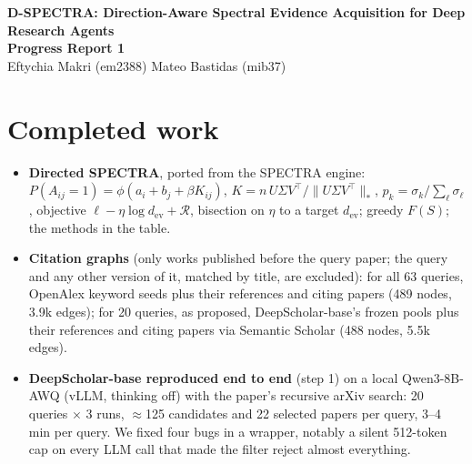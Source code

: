 \documentclass[10pt]{article}
\begin{document}
\begin{center}
{\large\bfseries D-SPECTRA: Direction-Aware Spectral Evidence Acquisition for Deep Research Agents\\[1pt]
Progress Report 1}\\[1pt]
Eftychia Makri (em2388) \quad Mateo Bastidas (mib37)
\end{center}
\vspace{-5pt}

\section{Completed work}
\begin{itemize}
\item \textbf{Directed SPECTRA}, ported from the SPECTRA engine: $P(A_{ij}{=}1)=\phi(a_i+b_j+\beta K_{ij})$, $K=n\,U\Sigma V^\top/\|U\Sigma V^\top\|_*$, $p_k=\sigma_k/\sum_\ell\sigma_\ell$, objective $\ell-\eta\log d_{\mathrm{ev}}+\mathcal{R}$, bisection on $\eta$ to a target $d_{\mathrm{ev}}$; greedy $F(S)$; the methods in the table.
\item \textbf{Citation graphs} (only works published before the query paper; the query and any other version of it, matched by title, are excluded): for all 63 queries, OpenAlex keyword seeds plus their references and citing papers (489 nodes, 3.9k edges); for 20 queries, as proposed, DeepScholar-base's frozen pools plus their references and citing papers via Semantic Scholar (488 nodes, 5.5k edges).
\item \textbf{DeepScholar-base reproduced end to end} (step 1) on a local Qwen3-8B-AWQ (vLLM, thinking off) with the paper's recursive arXiv search: 20 queries $\times$ 3 runs, $\approx$125 candidates and 22 selected papers per query, 3--4 min per query. We fixed four bugs in a wrapper, notably a silent 512-token cap on every LLM call that made the filter reject almost everything.
\end{itemize}
\end{document}

